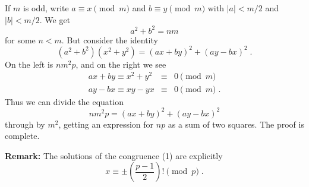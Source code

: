 \documentclass[12pt]{article}
\begin{document}
If $m$ is odd, write $a\equiv x\pmod{m}$ and $b\equiv y\pmod{m}$ with
$|a|<m/2$ and $|b|<m/2$. We get
$$a^2+b^2=nm$$
for some $n<m$. But consider the identity
$$(a^2+b^2)(x^2+y^2)=(ax+by)^2+(ay-bx)^2\;.$$
On the left is $nm^2p$, and on the right we see
\begin{eqnarray*}
ax+by\equiv x^2+y^2 & \equiv & 0\pmod{m} \\
ay-bx\equiv xy-yx & \equiv & 0\pmod{m}\;.
\end{eqnarray*}
Thus we can divide the equation
$$nm^2p=(ax+by)^2+(ay-bx)^2$$
through by $m^2$, getting an expression
for $np$ as a sum of two squares. The proof is complete.

\textbf{Remark: }The solutions of the congruence (1) are
explicitly
$$x\equiv\pm\left(\frac{p-1}{2}\right)!\pmod{p}\;.$$
\end{document}
